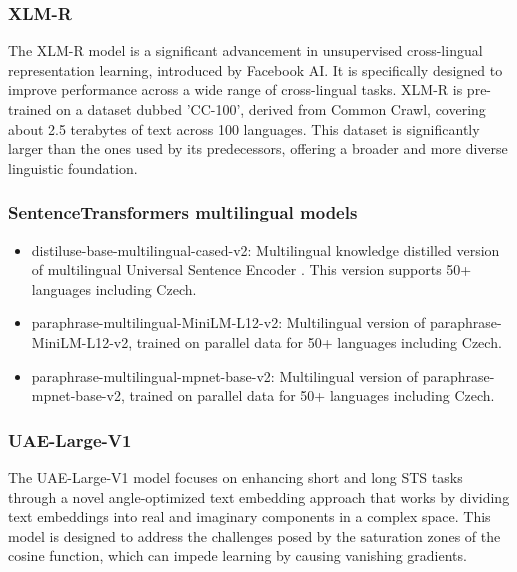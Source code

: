 \subsubsection{XLM-R \cite{xlm-roberta} }
The \ac{XLM-R} model is a significant advancement in unsupervised cross-lingual representation learning, introduced by Facebook AI.
It is specifically designed to improve performance across a wide range of cross-lingual tasks.
\ac{XLM-R} is pre-trained on a dataset dubbed 'CC-100', derived from Common Crawl, covering about 2.5 terabytes of text across 100 languages.
This dataset is significantly larger than the ones used by its predecessors, offering a broader and more diverse linguistic foundation.

\subsubsection{SentenceTransformers multilingual models \cite{reimers-2019-sentence-bert}}

\begin{itemize}
  \item distiluse-base-multilingual-cased-v2: Multilingual knowledge distilled version of multilingual Universal Sentence Encoder \cite{yang2019multilingual}. This version supports 50+ languages including Czech.
  \item paraphrase-multilingual-MiniLM-L12-v2: Multilingual version of paraphrase-MiniLM-L12-v2, trained on parallel data for 50+ languages including Czech.
  \item paraphrase-multilingual-mpnet-base-v2: Multilingual version of paraphrase-mpnet-base-v2, trained on parallel data for 50+ languages including Czech.
\end{itemize}



\subsubsection{UAE-Large-V1 \cite{UAE-Large-V1}}
The UAE-Large-V1 model focuses on enhancing short and long \ac{STS} tasks through a novel angle-optimized text embedding approach that works by dividing text embeddings into real and imaginary components in a complex space.
This model is designed to address the challenges posed by the saturation zones of the cosine function, which can impede learning by causing vanishing gradients.

